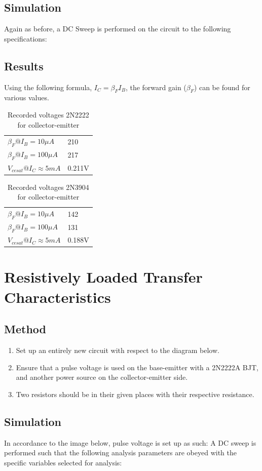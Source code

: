 \documentclass[12pt]{article}
\begin{document}
\subsection{Simulation}
Again as before, a  DC Sweep is performed on the circuit to the following specifications:
\subsection{Results}
Using the following formula, $I_C=\beta_FI_B$, the forward gain ($\beta_F$) can be found for various values.
\begin{table}[h]
\centering
\begin{tabular}{ll}
$\beta_{F} @ I_{B} = 10 \mu A$ & 210 \\
$\beta_{F} @ I_{B} = 100 \mu A$ & 217 \\
$V_{ce sat}@I_{C}\approx5mA $ & 0.211V
\end{tabular}
\caption{Recorded voltages  2N2222 for collector-emitter}
\end{table}
\begin{table}[h]
\centering
\begin{tabular}{ll}
$\beta_{F} @ I_{B} = 10 \mu A$ & 142 \\
$\beta_{F} @ I_{B} = 100 \mu A$ & 131 \\
$V_{ce sat}@I_{C}\approx5mA $ & 0.188V
\end{tabular}
\caption{Recorded voltages 2N3904 for collector-emitter}
\end{table}

\section{Resistively Loaded Transfer Characteristics}
\subsection{Method}
\begin{enumerate}
\item Set up an entirely new circuit with respect to the diagram below.
\item Ensure that a pulse voltage is used on the base-emitter with a 2N2222A BJT, and another power source on the collector-emitter side.
\item Two resistors should be in their given places with their respective resistance.
\end{enumerate}
\subsection{Simulation}
In accordance to the image below, pulse voltage is set up as such:
A DC sweep is performed such that the following analysis parameters are obeyed with the specific variables selected for analysis:
\end{document}
